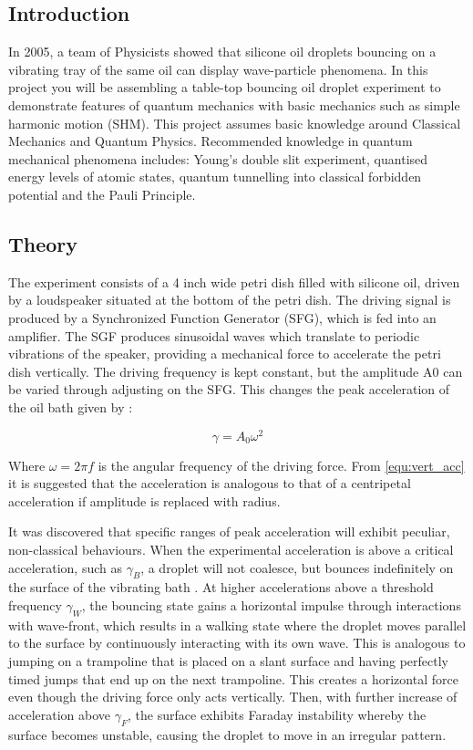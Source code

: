 \subsection{Introduction}

In 2005, a team of Physicists showed that silicone oil droplets bouncing on a vibrating tray of the same oil can display wave-particle phenomena. In this project you will be assembling a table-top bouncing oil droplet experiment to demonstrate features of quantum mechanics with basic mechanics such as simple harmonic motion (SHM). This project assumes basic knowledge around Classical Mechanics and Quantum Physics. Recommended knowledge in quantum mechanical phenomena includes: Young's double slit experiment, quantised energy levels of atomic states, quantum tunnelling into classical forbidden potential and the Pauli Principle.


\subsection{Theory}

The experiment consists of a 4 inch wide petri dish filled with silicone oil, driven by a loudspeaker situated at the bottom of the petri dish. The driving signal is produced by a Synchronized Function Generator (SFG), which is fed into an amplifier. The SGF produces sinusoidal waves which translate to periodic vibrations of the speaker, providing a mechanical force to accelerate the petri dish vertically. The driving frequency is kept constant, but the amplitude A0 can be varied through adjusting on the SFG. This changes the peak acceleration of the oil bath given by \cite{harris2017visualization}:

\begin{equation}
\gamma =A_0{\omega }^2
\label{equ:vert_acc}
\end{equation}

Where $\omega =2\pi f$ is the angular frequency of the driving force. From \ref{equ:vert_acc} it is suggested that the acceleration is analogous to that of a centripetal acceleration if amplitude is replaced with radius.

It was discovered that specific ranges of peak acceleration will exhibit peculiar, non-classical behaviours. When the experimental acceleration is above a critical acceleration, such as ${\gamma }_B$, a droplet will not coalesce, but bounces indefinitely on the surface of the vibrating bath \cite{brady2014bouncing}. At  higher accelerations above a threshold frequency ${\gamma }_W$, the bouncing state gains a horizontal impulse through interactions with wave-front, which results in a walking state where the droplet moves parallel to the surface by continuously interacting with its own wave. This is analogous to jumping on a trampoline that is placed on a slant surface and having perfectly timed jumps that end up on the next trampoline. This creates a horizontal force even though the driving force only acts vertically. Then, with further increase of acceleration above ${\gamma }_F$, the surface exhibits Faraday instability whereby the surface becomes unstable, causing the droplet to move in an irregular pattern.

